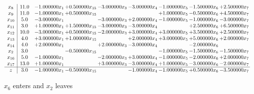 \documentclass[10pt]{article}
\begin{document}
 \[\begin{array}{c| c c@{\hskip 2pt} c@{\hskip 2pt} c@{\hskip 2pt} c@{\hskip 2pt} c@{\hskip 2pt} c@{\hskip 2pt} c@{\hskip 2pt} }
 x_{8}   &  11.0 & -1.000000 x_{1} & + 0.500000 x_{15} & -3.000000 x_{3} & -3.000000 x_{4} & -1.000000 x_{5} & -1.500000 x_{6} & + 2.500000 x_{7}\\
 x_{9}   &  11.0 & -1.000000 x_{1} & + 0.500000 x_{15} &    &   & + 1.000000 x_{5} & -0.500000 x_{6} & + 4.500000 x_{7}\\
 x_{10}   &  5.0 & -3.000000 x_{1} &   & -3.000000 x_{3} & + 2.000000 x_{4} & -1.000000 x_{5} & -1.000000 x_{6} & -3.000000 x_{7}\\
 x_{11}   &  3.0 & + 1.000000 x_{1} & + 1.500000 x_{15} & -3.000000 x_{3} & -3.000000 x_{4} &   & + 2.500000 x_{6} & + 6.500000 x_{7}\\
 x_{12}   &  10.0 & -3.000000 x_{1} & + 0.500000 x_{15} & -2.000000 x_{3} & + 3.000000 x_{4} & + 3.000000 x_{5} & + 3.500000 x_{6} & + 2.500000 x_{7}\\
 x_{13}   &  4.0 & + 3.000000 x_{1} & + 1.000000 x_{15} &   & + 2.000000 x_{4} & + 3.000000 x_{5} & + 5.000000 x_{6} & + 2.000000 x_{7}\\
 x_{14}   &  4.0 & + 2.000000 x_{1} &   & + 2.000000 x_{3} & -3.000000 x_{4} &   & -2.000000 x_{6} &   \\
 x_{2}   &  3.0  &   & -0.500000 x_{15} &    &   & -1.000000 x_{5} & -1.500000 x_{6} & -1.500000 x_{7}\\
 x_{16}   &  5.0 & -1.000000 x_{1} &   & -2.000000 x_{3} & + 3.000000 x_{4} & -1.000000 x_{5} & -2.000000 x_{6} & + 2.000000 x_{7}\\
 x_{17}   &  13.0 & + 1.000000 x_{1} &   & + 3.000000 x_{3} & -3.000000 x_{4} & + 1.000000 x_{5} & -3.000000 x_{6} & -2.000000 x_{7}\\
\hline
z    &  3.0 & -1.000000 x_{1} & -0.500000 x_{15} &   & -1.000000 x_{4} & -1.000000 x_{5} & + 0.500000 x_{6} & -3.500000 x_{7}\\
\end{array}\]


 $ x_{6} $ enters and $ x_{2} $ leaves 
\end{document}
